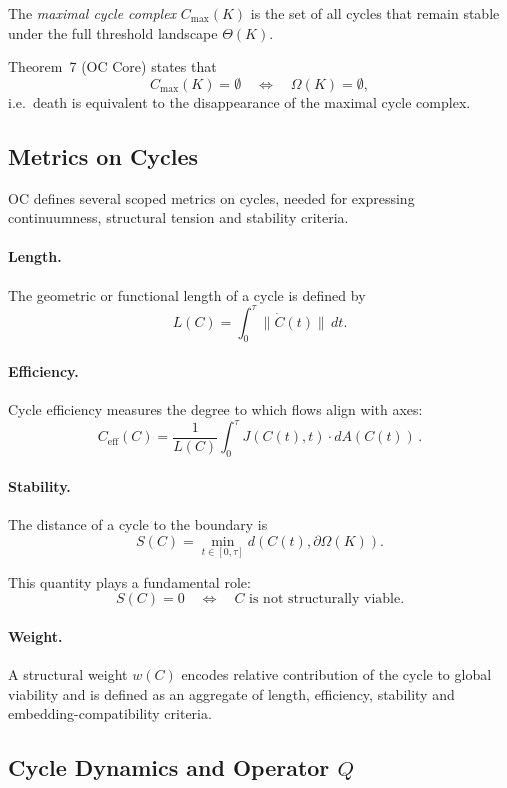 The \emph{maximal cycle complex} \(C_{\max}(K)\) is the set of all cycles
that remain stable under the full threshold landscape \(\Theta(K)\).

Theorem~7 (OC Core) states that
\[
  C_{\max}(K) = \emptyset
  \quad\Longleftrightarrow\quad
  \Omega(K) = \emptyset,
\]
i.e.\ death is equivalent to the disappearance of the maximal cycle complex.

\subsection{Metrics on Cycles}

OC defines several scoped metrics on cycles, needed for expressing
continuumness, structural tension and stability criteria.

\paragraph{Length.}
The geometric or functional length of a cycle is defined by
\[
  L(C) = \int_{0}^{\tau} \big\|\dot{C}(t)\big\|\, dt.
\]

\paragraph{Efficiency.}
Cycle efficiency measures the degree to which flows align with axes:
\[
  C_{\mathrm{eff}}(C)
  = \frac{1}{L(C)} \int_0^{\tau}
      J(C(t),t)\cdot dA(C(t))
    \,.
\]

\paragraph{Stability.}
The distance of a cycle to the boundary is
\[
  S(C) = \min_{t\in[0,\tau]}
         d\!\left(C(t),\partial\Omega(K)\right).
\]

This quantity plays a fundamental role:
\[
  S(C)=0
  \quad\Longleftrightarrow\quad
  C \text{ is not structurally viable}.
\]

\paragraph{Weight.}
A structural weight \(w(C)\) encodes relative contribution of the cycle to
global viability and is defined as an aggregate of length, efficiency,
stability and embedding-compatibility criteria.

\subsection{Cycle Dynamics and Operator \texorpdfstring{\(Q\)}{Q}}

